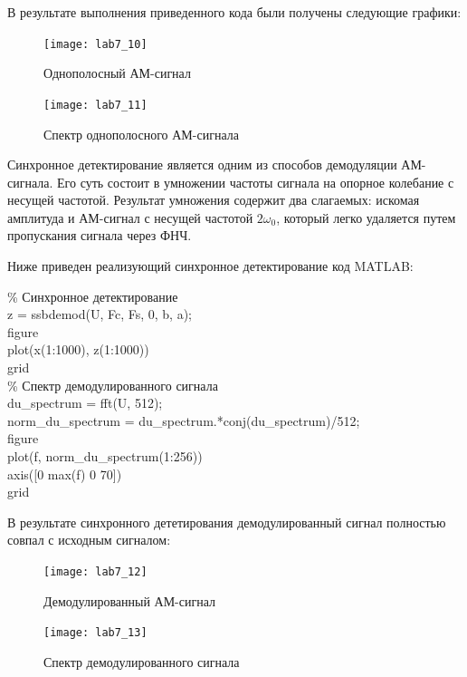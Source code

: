 \documentclass[10pt,a4paper]{article}
\begin{document}
В результате выполнения приведенного кода были получены следующие графики:

\begin{figure}[h]\centering
  \parbox[b]{0.49\textwidth}{\centering
    \texttt{[image: lab7\_10]} 
    \caption{Однополосный АМ-сигнал}\label{fig.l7_10}}
  \hfil\hfil 
  \begin{minipage}[b]{0.49\textwidth}
	\centering
	\texttt{[image: lab7\_11]}
	\caption{Спектр однополосного АМ-сигнала}\label{fig.l7_11} 
  \end{minipage}
\end{figure}

\FloatBarrier

Синхронное детектирование является одним из способов демодуляции АМ-сигнала. Его суть состоит в умножении частоты сигнала на опорное колебание с несущей частотой. Результат умножения содержит два слагаемых: искомая амплитуда и АМ-сигнал с несущей частотой $2\omega_0$, который легко удаляется путем пропускания сигнала через ФНЧ.

Ниже приведен реализующий синхронное детектирование код MATLAB:

\begin{flushleft}
\% Синхронное детектирование\\
z = ssbdemod(U, Fc, Fs, 0, b, a);\\
figure\\
plot(x(1:1000), z(1:1000))\\
grid\\

\% Спектр демодулированного сигнала\\
du\_spectrum = fft(U, 512);\\
norm\_du\_spectrum = du\_spectrum.*conj(du\_spectrum)/512;\\
figure\\
plot(f, norm\_du\_spectrum(1:256))\\
axis([0 max(f) 0 70])\\
grid\\
\end{flushleft}

В результате синхронного дететирования демодулированный сигнал полностью совпал с исходным сигналом:

\begin{figure}[h]\centering
  \parbox[b]{0.49\textwidth}{\centering
    \texttt{[image: lab7\_12]} 
    \caption{Демодулированный АМ-сигнал}\label{fig.l7_12}}
  \hfil\hfil 
  \begin{minipage}[b]{0.49\textwidth}
	\centering
	\texttt{[image: lab7\_13]}
	\caption{Спектр демодулированного сигнала}\label{fig.l7_13} 
  \end{minipage}
\end{figure}
\end{document}
